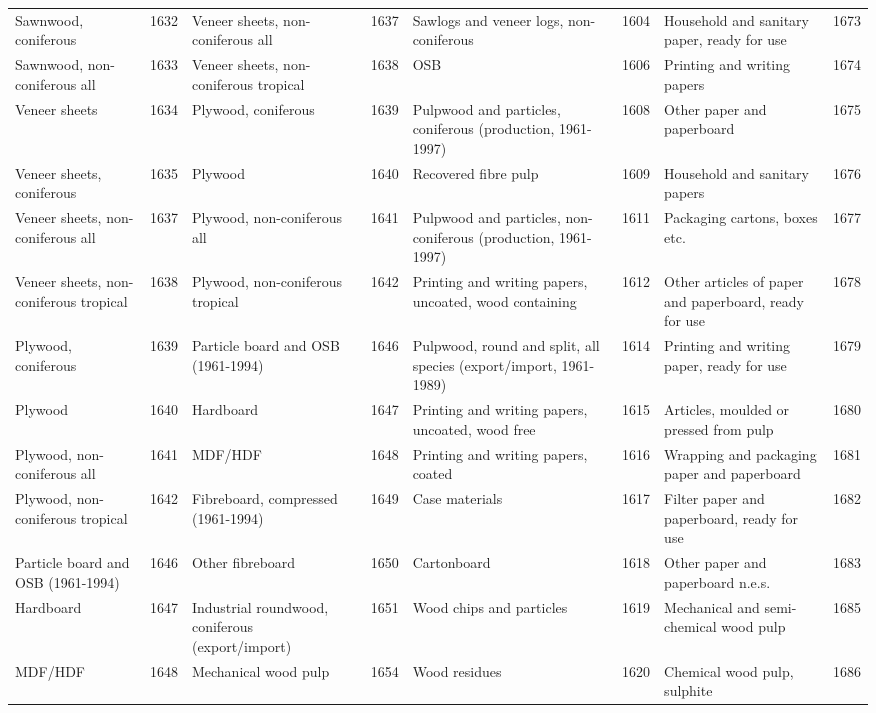 \documentclass[
]{book}
\begin{document}
\begin{table}
\begin{tabular}[t]{lrlrlrlr}
Sawnwood, coniferous & 1632 & Veneer sheets, non-coniferous all & 1637 & Sawlogs and veneer logs, non-coniferous & 1604 & Household and sanitary paper, ready for use & 1673\\
Sawnwood, non-coniferous all & 1633 & Veneer sheets, non-coniferous tropical & 1638 & OSB & 1606 & Printing and writing papers & 1674\\
\addlinespace
Veneer sheets & 1634 & Plywood, coniferous & 1639 & Pulpwood and particles, coniferous (production, 1961-1997) & 1608 & Other paper and paperboard & 1675\\
Veneer sheets, coniferous & 1635 & Plywood & 1640 & Recovered fibre pulp & 1609 & Household and sanitary papers & 1676\\
Veneer sheets, non-coniferous all & 1637 & Plywood, non-coniferous all & 1641 & Pulpwood and particles, non-coniferous (production, 1961-1997) & 1611 & Packaging cartons, boxes etc. & 1677\\
Veneer sheets, non-coniferous tropical & 1638 & Plywood, non-coniferous tropical & 1642 & Printing and writing papers, uncoated, wood containing & 1612 & Other articles of paper and paperboard, ready for use & 1678\\
Plywood, coniferous & 1639 & Particle board and OSB (1961-1994) & 1646 & Pulpwood, round and split, all species (export/import, 1961-1989) & 1614 & Printing and writing paper, ready for use & 1679\\
\addlinespace
Plywood & 1640 & Hardboard & 1647 & Printing and writing papers, uncoated, wood free & 1615 & Articles, moulded or pressed from pulp & 1680\\
Plywood, non-coniferous all & 1641 & MDF/HDF & 1648 & Printing and writing papers, coated & 1616 & Wrapping and packaging paper and paperboard & 1681\\
Plywood, non-coniferous tropical & 1642 & Fibreboard, compressed (1961-1994) & 1649 & Case materials & 1617 & Filter paper and paperboard, ready for use & 1682\\
Particle board and OSB (1961-1994) & 1646 & Other fibreboard & 1650 & Cartonboard & 1618 & Other paper and paperboard n.e.s. & 1683\\
Hardboard & 1647 & Industrial roundwood, coniferous (export/import) & 1651 & Wood chips and particles & 1619 & Mechanical and semi-chemical wood pulp & 1685\\
\addlinespace
MDF/HDF & 1648 & Mechanical wood pulp & 1654 & Wood residues & 1620 & Chemical wood pulp, sulphite & 1686\\

\end{tabular}
\end{table}
\end{document}
